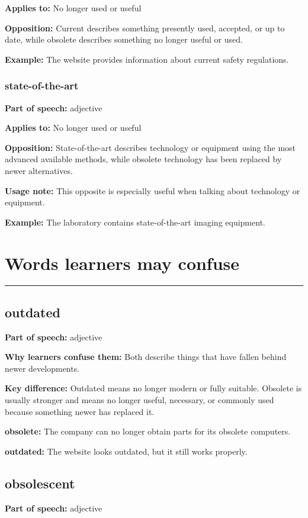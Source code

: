 \documentclass[11pt]{article}
\newcommand{\sectionrule}{\par\vspace{-0.5em}\noindent\textcolor{Accent}{\rule{\linewidth}{0.6pt}}\par}
\begin{document}
\textbf{Applies to:} No longer used or useful

\textbf{Opposition:} Current describes something presently used, accepted, or up to date, while obsolete describes something no longer useful or used.

\textbf{Example:} The website provides information about current safety regulations.

\subsubsection{state-of-the-art}
\textbf{Part of speech:} adjective

\textbf{Applies to:} No longer used or useful

\textbf{Opposition:} State-of-the-art describes technology or equipment using the most advanced available methods, while obsolete technology has been replaced by newer alternatives.

\textbf{Usage note:} This opposite is especially useful when talking about technology or equipment.

\textbf{Example:} The laboratory contains state-of-the-art imaging equipment.

\section{Words learners may confuse}
\sectionrule
\subsection{outdated}
\textbf{Part of speech:} adjective

\textbf{Why learners confuse them:} Both describe things that have fallen behind newer developments.

\textbf{Key difference:} Outdated means no longer modern or fully suitable. Obsolete is usually stronger and means no longer useful, necessary, or commonly used because something newer has replaced it.

\textbf{obsolete:} The company can no longer obtain parts for its obsolete computers.

\textbf{outdated:} The website looks outdated, but it still works properly.

\subsection{obsolescent}
\textbf{Part of speech:} adjective
\end{document}
